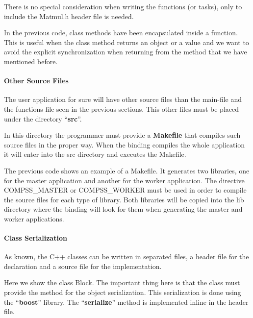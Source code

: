 There is no special consideration when writing the functions (or tasks), only to include the Matmul.h header file is needed.

In the previous code, class methods have been encapsulated inside a function. This is useful when the class method returns an object or a value and we want to avoid the explicit synchronization when returning from the method that we have mentioned before.

\paragraph{Other Source Files}
The user application for sure will have other source files than the main-file and the functions-file seen in the previous sections. This other files must be placed under the directory ``{\bf src}''.

In this directory the programmer must provide a {\bf Makefile} that compiles such source files in the proper way. When the binding compiles the whole application it will enter into the src directory and executes the Makefile.

The previous code shows an example of a Makefile. It generates two libraries, one for the master application and another for the worker application. The directive COMPSS\_MASTER or COMPSS\_WORKER must be used in order to compile the source files for each type of library. Both libraries will be copied into the lib directory where the binding will look for them when generating the master and worker applications.

\paragraph{Class Serialization}
As known, the C++ classes can be written in separated files, a header file for the declaration and a source file for the implementation.

Here we show the class Block. The important thing here is that the class must provide the method for the object serialization. This serialization is done using the ``{\bf boost}'' library. The ``{\bf serialize}'' method is implemented inline in the header file.

